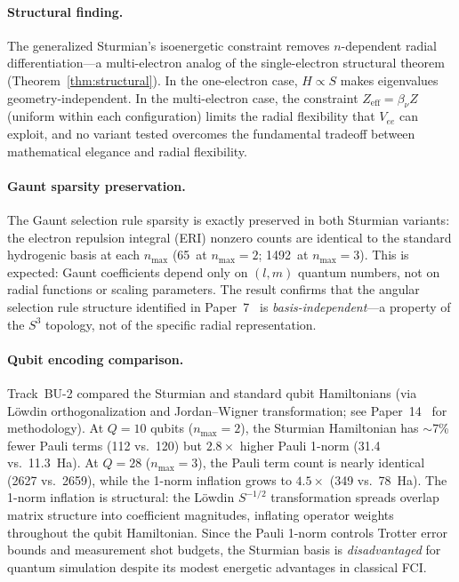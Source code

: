 \documentclass[aps,pra,twocolumn,superscriptaddress,longbibliography]{revtex4-2}
\begin{document}
\paragraph{Structural finding.}
The generalized Sturmian's isoenergetic constraint removes
$n$-dependent radial differentiation---a multi-electron analog of the
single-electron structural theorem
(Theorem~\ref{thm:structural}).  In the one-electron case,
$H \propto S$ makes eigenvalues geometry-independent.  In the
multi-electron case, the constraint
$Z_{\mathrm{eff}} = \beta_\nu Z$ (uniform within each
configuration) limits the radial flexibility that $V_{ee}$ can
exploit, and no variant tested overcomes the fundamental tradeoff
between mathematical elegance and radial flexibility.

\paragraph{Gaunt sparsity preservation.}
The Gaunt selection rule sparsity is exactly preserved in both
Sturmian variants: the electron repulsion integral (ERI) nonzero
counts are identical to the standard hydrogenic basis at each
$n_{\max}$ (65~at $n_{\max} = 2$; 1492~at $n_{\max} = 3$).
This is expected: Gaunt coefficients depend only on
$(l, m)$ quantum numbers, not on radial functions or scaling
parameters.  The result confirms that the angular selection rule
structure identified in Paper~7~\cite{loutey_paper7} is
\emph{basis-independent}---a property of the $S^3$ topology, not of
the specific radial representation.

\paragraph{Qubit encoding comparison.}
Track~BU-2 compared the Sturmian and standard qubit Hamiltonians
(via L\"owdin orthogonalization and Jordan--Wigner transformation;
see Paper~14~\cite{loutey_paper14} for methodology).
At $Q = 10$ qubits ($n_{\max} = 2$), the Sturmian Hamiltonian has
$\sim$7\% fewer Pauli terms (112 vs.\ 120) but $2.8\times$ higher
Pauli 1-norm (31.4 vs.\ 11.3~Ha).  At $Q = 28$ ($n_{\max} = 3$),
the Pauli term count is nearly identical (2627 vs.\ 2659), while
the 1-norm inflation grows to $4.5\times$ (349 vs.\ 78~Ha).
The 1-norm inflation is structural: the L\"owdin $S^{-1/2}$
transformation spreads overlap matrix structure into coefficient
magnitudes, inflating operator weights throughout the qubit
Hamiltonian.  Since the Pauli 1-norm controls Trotter error bounds
and measurement shot budgets, the Sturmian basis is
\emph{disadvantaged} for quantum simulation despite its modest
energetic advantages in classical FCI.
\end{document}
